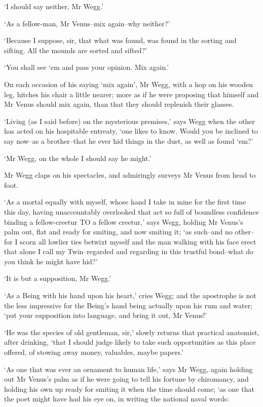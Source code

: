 ‘I should say neither, Mr Wegg.’

‘As a fellow-man, Mr Venus--mix again--why neither?’

‘Because I suppose, sir, that what was found, was found in the sorting
and sifting. All the mounds are sorted and sifted?’

‘You shall see ‘em and pass your opinion. Mix again.’

On each occasion of his saying ‘mix again’, Mr Wegg, with a hop on
his wooden leg, hitches his chair a little nearer; more as if he were
proposing that himself and Mr Venus should mix again, than that they
should replenish their glasses.

‘Living (as I said before) on the mysterious premises,’ says Wegg when
the other has acted on his hospitable entreaty, ‘one likes to know.
Would you be inclined to say now--as a brother--that he ever hid things
in the dust, as well as found ‘em?’

‘Mr Wegg, on the whole I should say he might.’

Mr Wegg claps on his spectacles, and admiringly surveys Mr Venus from
head to foot.

‘As a mortal equally with myself, whose hand I take in mine for the
first time this day, having unaccountably overlooked that act so full of
boundless confidence binding a fellow-creetur TO a fellow creetur,’ says
Wegg, holding Mr Venus’s palm out, flat and ready for smiting, and now
smiting it; ‘as such--and no other--for I scorn all lowlier ties betwixt
myself and the man walking with his face erect that alone I call my
Twin--regarded and regarding in this trustful bond--what do you think he
might have hid?’

‘It is but a supposition, Mr Wegg.’

‘As a Being with his hand upon his heart,’ cries Wegg; and the
apostrophe is not the less impressive for the Being’s hand being
actually upon his rum and water; ‘put your supposition into language,
and bring it out, Mr Venus!’

‘He was the species of old gentleman, sir,’ slowly returns that
practical anatomist, after drinking, ‘that I should judge likely to
take such opportunities as this place offered, of stowing away money,
valuables, maybe papers.’

‘As one that was ever an ornament to human life,’ says Mr Wegg, again
holding out Mr Venus’s palm as if he were going to tell his fortune by
chiromancy, and holding his own up ready for smiting it when the time
should come; ‘as one that the poet might have had his eye on, in writing
the national naval words:

